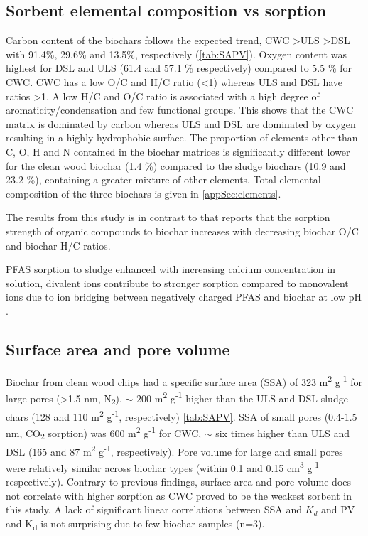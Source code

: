 \subsection{Sorbent elemental composition vs sorption}
Carbon content of the biochars follows the expected trend, CWC \textgreater ULS \textgreater DSL with 91.4\%, 29.6\% and 13.5\%, respectively (\cref{tab:SAPV}). Oxygen content was highest for DSL and ULS (61.4 and 57.1 \% respectively) compared to 5.5 \% for CWC. CWC has a low O/C and H/C ratio (\textless 1) whereas ULS and DSL have ratios \textgreater 1. A low H/C and O/C ratio is associated with a high degree of aromaticity/condensation and few functional groups. This shows that the CWC matrix is dominated by carbon whereas ULS and DSL are dominated by oxygen resulting in a highly hydrophobic surface. The proportion of elements other than C, O, H and N contained in the biochar matrices is significantly different lower for the clean wood biochar (1.4 \%) compared to the sludge biochars (10.9 and 23.2 \%), containing a greater mixture of other elements. Total elemental composition of the three biochars is given in \cref{appSec:elements}. 

The results from this study is in contrast to \cite{Hale2016} that reports that the sorption strength of organic compounds to biochar increases with decreasing biochar O/C and biochar H/C ratios. 

PFAS sorption to sludge enhanced with increasing calcium concentration in solution, divalent ions contribute to stronger sorption compared to monovalent ions due to ion bridging between negatively charged PFAS and biochar at low pH \citep{zhang2013sorption,arvaniti2014sorption,arvaniti2015review}. 

\subsection{Surface area and pore volume}
Biochar from clean wood chips had a specific surface area (SSA) of 323  m\textsuperscript{2} g\textsuperscript{-1} for large pores (\textgreater 1.5 nm, N\textsubscript{2}), $\sim$ 200 m\textsuperscript{2} g\textsuperscript{-1} higher than the ULS and DSL sludge chars (128 and 110  m\textsuperscript{2} g\textsuperscript{-1}, respectively) \cref{tab:SAPV}. SSA of small pores (0.4-1.5 nm, CO\textsubscript{2} sorption) was 600  m\textsuperscript{2} g\textsuperscript{-1} for CWC, $\sim$ six times higher than ULS and DSL (165 and 87  m\textsuperscript{2} g\textsuperscript{-1}, respectively). Pore volume for large and small pores were relatively similar across biochar types (within 0.1 and 0.15 cm\textsuperscript{3} g\textsuperscript{-1} respectively). Contrary to previous findings, surface area and pore volume does not correlate with higher sorption as CWC proved to be the weakest sorbent in this study. A lack of significant linear correlations between SSA and $K_d$ and PV and K\textsubscript{d} is not surprising due to few biochar samples (n=3). 

